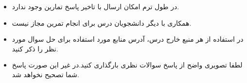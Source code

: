 
\begin{itemize}
	\small
	\setlength\itemsep{0.05em}
	\item
	در طول ترم امکان ارسال با تاخیر پاسخ تمارین وجود ندارد. 
	\item
    همکاری با دیگر دانشجویان درس برای انجام تمرین مجاز نیست. 
    \item 
    در استفاده از هر منبع خارج درس، آدرس منابع مورد استفاده برای حل سوال مورد نظر را ذکر کنید.
    \item 
    لطفا تصویری واضح از پاسخ سوالات نظری بارگذاری کنید.در غیر این صورت پاسخ
    شما تصحیح نخواهد شد.
    
\end{itemize}
